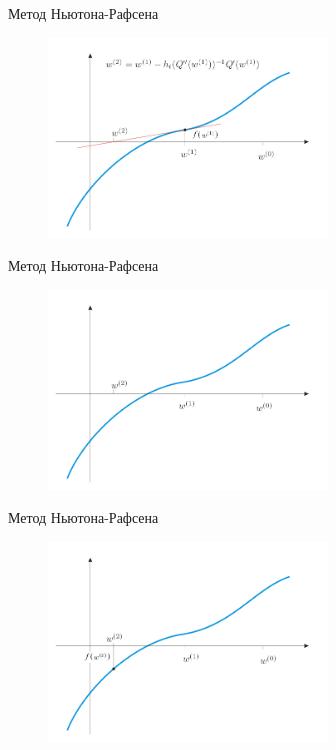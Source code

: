 \documentclass[10pt]{beamer}
\begin{document}
\begin{frame}{Метод Ньютона-Рафсена}
	\begin{figure}[htbp]
	  \includegraphics[height=150pt, keepaspectratio = true]{images/newton-8}   
	\end{figure}
\end{frame}

\begin{frame}{Метод Ньютона-Рафсена}
	\begin{figure}[htbp]
	  \includegraphics[height=150pt, keepaspectratio = true]{images/newton-9}   
	\end{figure}
\end{frame}

\begin{frame}{Метод Ньютона-Рафсена}
	\begin{figure}[htbp]
	  \includegraphics[height=150pt, keepaspectratio = true]{images/newton-10}   
	\end{figure}
\end{frame}
\end{document}
